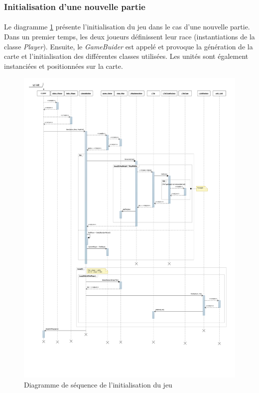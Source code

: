 \subsubsection{Initialisation d'une nouvelle partie}

\paragraph{}
Le diagramme \ref{fig:sd_init} présente l'initialisation du jeu dans le cas d'une nouvelle partie.
Dans un premier temps, les deux joueurs définissent leur race (instantiations de la classe \emph{Player}).
Ensuite, le \emph{GameBuider} est appelé et provoque la génération de la carte et l'initialisation des différentes classes utilisées.
Les unités sont également instanciées et positionnées sur la carte.

\begin{figure}
  \centering
  \includegraphics[width=13cm]{schemas/sd_init.png}
  \caption{Diagramme de séquence de l'initialisation du jeu}
  \label{fig:sd_init}
\end{figure}

